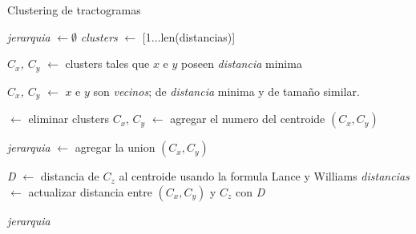 \begin{algorithm}[h!]
\caption{Clustering de tractogramas}\label{alg:nuestrometodo}
\begin{algorithmic}[1]

                      
    \State \emph{jerarquia} $\gets \emptyset$
    \State \emph{clusters} $\gets$ [1$\dots$len(distancias)]                  
                      


        \State \emph{$C_x$, $C_y$} $\gets$ clusters tales que $x$ e $y$ poseen \emph{distancia} minima      
            
    \Else{}

        \State \emph{$C_x$, $C_y$} $\gets$ $x$ e $y$ son \emph{vecinos}; 
                                   de \emph{distancia} minima y de tama\~no similar.

    \EndIf
    
     $\gets$ eliminar clusters $C_x$, $C_y$
     $\gets$ agregar el numero del centroide $(C_x,C_y)$ 
                          
    \State \emph{jerarquia} $\gets$ agregar la union $(C_x,C_y)$
    
        \State \emph{D} $\gets$ distancia de $C_z$ al centroide usando la formula Lance y Williams
        \State \emph{distancias} $\gets$ actualizar distancia entre $(C_x,C_y)$ y $C_z$ con \emph{D}
    \EndFor            
    
\EndFor


\State \Return \emph{jerarquia} 
 
\EndProcedure 

\end{algorithmic}
\end{algorithm}


